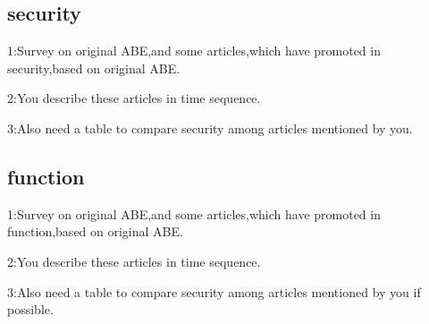 \subsection{security}
1:Survey on original ABE,and some articles,which have promoted in security,based on original ABE.

2:You describe these articles in time sequence.

3:Also need a table to compare security among articles mentioned by you.

\subsection{function}
1:Survey on original ABE,and some articles,which have promoted in function,based on original ABE.

2:You describe these articles in time sequence.

3:Also need a table to compare security among articles mentioned by you if possible.

